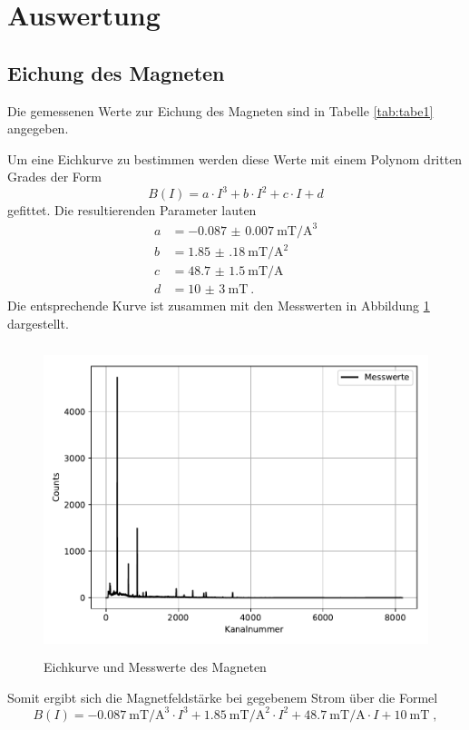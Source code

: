 \section{Auswertung}

\subsection{Eichung des Magneten}
Die gemessenen Werte zur Eichung des Magneten sind in Tabelle \ref{tab:tabe1} angegeben.

Um eine Eichkurve zu bestimmen werden diese Werte mit einem Polynom dritten Grades
der Form
\begin{equation}
  B(I)=a\cdot I^3+b\cdot I^2 + c \cdot I +d
\end{equation}
gefittet.
Die resultierenden Parameter lauten
\begin{align*}
  a &= \SI{-0.087(7)}{\milli\tesla\per\cubic\ampere} \\
  b &= \SI{1.85(18)}{\milli\tesla\per\square\ampere}\\
  c &= \SI{48.7(15)}{\milli\tesla\per\ampere}\\
  d &= \SI{10(3)}{\milli\tesla} \: .
\end{align*}
Die entsprechende Kurve ist zusammen mit den Messwerten in Abbildung \ref{fig:plot1}
dargestellt.
\begin{figure}
  \centering
  \includegraphics[height=9cm]{Plot1.pdf}
  \caption{Eichkurve und Messwerte des Magneten}
  \label{fig:plot1}
\end{figure}
Somit ergibt sich die Magnetfeldstärke bei gegebenem Strom über die Formel
\begin{equation}
  B(I)=\SI{-0.087}{\milli\tesla\per\cubic\ampere}\cdot I^3
  +\SI{1.85}{\milli\tesla\per\square\ampere}\cdot I^2
  +\SI{48.7}{\milli\tesla\per\ampere} \cdot I + \SI{10}{\milli\tesla} \; ,
  \label{eqn:bfeld}
\end{equation}
